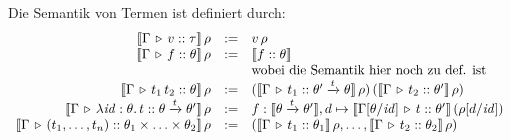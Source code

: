 \documentclass[12pt,a4paper,bigheadings]{scrartcl}
\newcommand{\semantic}[1]{\ensuremath{\llbracket#1\rrbracket}}
\newcommand{\tto}{\ensuremath{\xrightarrow{t}}}
\begin{document}
\pagebreak[3] \noindent
Die Semantik von Termen ist definiert durch:
\[\begin{array}{rcl}
  \semantic{\Tj{\Gamma}{v}{\tau}}\,\rho
  & := &
  v\,\rho 
  \\
  \semantic{\Tj{\Gamma}{f}{\theta}}\,\rho
  & := &
  \semantic{\tj{f}{\theta}} \\
  && \text{wobei die Semantik hier noch zu def. ist}
  \\
  \semantic{\Tj{\Gamma}{\app{t_1}{t_2}}{\theta}}\,\rho
  & := &
  (\semantic{\Tj{\Gamma}{t_1}{\theta'\tto\theta}}\,\rho)\,(\semantic{\Tj{\Gamma}{t_2}{\theta'}}\,\rho)
  \\
  \semantic{\Tj{\Gamma}{\abstr{\id:\theta}{t}}{\theta\tto\theta'}}\,\rho
  & := &
  f: \semantic{\theta\tto\theta'},
  d \mapsto \semantic{\Tj{\Gamma[\theta/\id]}{t}{\theta'}}\,(\rho[d/\id])
  \\
  \semantic{\Tj{\Gamma}{(t_1,\ldots,t_n)}{\theta_1\times\ldots\times\theta_2}}\,\rho
  & := &
  (\semantic{\Tj{\Gamma}{t_1}{\theta_1}}\,\rho,\ldots,\semantic{\Tj{\Gamma}{t_2}{\theta_2}}\,\rho)
\end{array}\]
\end{document}
